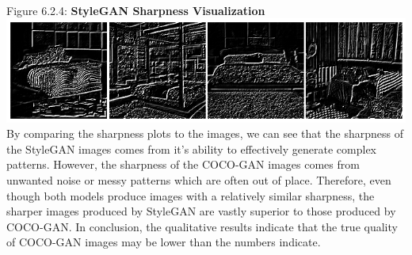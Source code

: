 \documentclass[10pt]{article}
\begin{document}
\begin{multicols*}{2}
        \\ Figure 6.2.4: \textbf{StyleGAN Sharpness Visualization}\\
        \includegraphics[scale=0.35]{sharpness-images/stylegan_sharpness_lines.png}
        \\
        By comparing the sharpness plots to the images, we can see that the sharpness of the StyleGAN images comes from it's ability to effectively generate complex patterns.
        However, the sharpness of the COCO-GAN images comes from unwanted noise or messy patterns which are often out of place.
        Therefore, even though both models produce images with a relatively similar sharpness, the sharper images produced by StyleGAN are vastly superior to those produced by COCO-GAN.
        In conclusion, the qualitative results indicate that the true quality of COCO-GAN images may be lower than the numbers indicate.
        

\end{multicols*}
\end{document}
